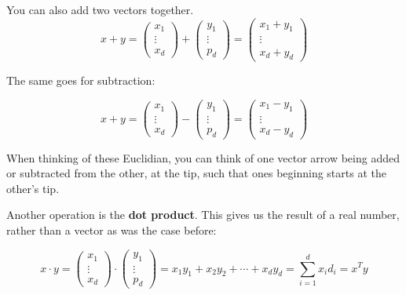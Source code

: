 You can also add two vectors together.
\[
	x+ y =
	\begin{pmatrix}
		x_{1}  \\
		\vdots \\
		x_{d}
	\end{pmatrix} + \begin{pmatrix}
		y_{1}  \\
		\vdots \\
		p_{d}
	\end{pmatrix} =
	\begin{pmatrix}
		x_{1} + y_{1} \\
		\vdots        \\
		x_{d} + y_{d}
	\end{pmatrix}
\]

The same goes for subtraction:

\[
	x+ y =
	\begin{pmatrix}
		x_{1}  \\
		\vdots \\
		x_{d}
	\end{pmatrix} - \begin{pmatrix}
		y_{1}  \\
		\vdots \\
		p_{d}
	\end{pmatrix} =
	\begin{pmatrix}
		x_{1} - y_{1} \\
		\vdots        \\
		x_{d} - y_{d}
	\end{pmatrix}
\]

When thinking of these Euclidian, you can think of one vector arrow being added or subtracted from the other, at the tip, such that ones beginning starts at the other's tip.

Another operation is the \textbf{dot product}. This gives us the result of a real number, rather than a vector as was the case before:

\[
	x \cdot y =
	\begin{pmatrix}
		x_{1}  \\
		\vdots \\
		x_{d}
	\end{pmatrix} \cdot \begin{pmatrix}
		y_{1}  \\
		\vdots \\
		p_{d}
	\end{pmatrix} =
	x_{1}y_{1} + x_{2}y_{2} + \cdots + x_{d}y_{d} = \sum_{i=1}^d x_{i}d_{i} = x^{T}y
\]

